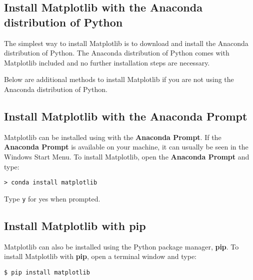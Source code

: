 \documentclass{book}
\newcommand{\passthrough}[1]{#1}
\begin{document}
    
        \hypertarget{install-matplotlib-with-the-anaconda-distribution-of-python}{%
\subsection{Install Matplotlib with the Anaconda distribution of
Python}\label{install-matplotlib-with-the-anaconda-distribution-of-python}}

The simplest way to install Matplotlib is to download and install the
Anaconda distribution of Python. The Anaconda distribution of Python
comes with Matplotlib included and no further installation steps are
necessary.

Below are additional methods to install Matplotlib if you are not using
the Anaconda distribution of Python.
    




    
        \hypertarget{install-matplotlib-with-the-anaconda-prompt}{%
\subsection{Install Matplotlib with the Anaconda
Prompt}\label{install-matplotlib-with-the-anaconda-prompt}}

Matplotlib can be installed using with the \textbf{Anaconda Prompt}. If
the \textbf{Anaconda Prompt} is available on your machine, it can
usually be seen in the Windows Start Menu. To install Matplotlib, open
the \textbf{Anaconda Prompt} and type:

\begin{lstlisting}
> conda install matplotlib
\end{lstlisting}

Type \passthrough{\lstinline!y!} for yes when prompted.
    




    
        \hypertarget{install-matplotlib-with-pip}{%
\subsection{\texorpdfstring{Install Matplotlib with
\textbf{pip}}{Install Matplotlib with pip}}\label{install-matplotlib-with-pip}}

Matplotlib can also be installed using the Python package manager,
\textbf{pip}. To install Matplotlib with \textbf{pip}, open a terminal
window and type:

\begin{lstlisting}
$ pip install matplotlib
\end{lstlisting}
\end{document}
